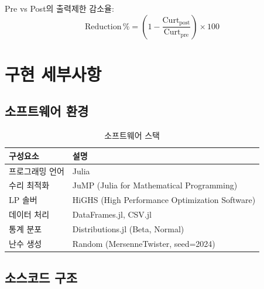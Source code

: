 \documentclass[11pt, a4paper]{article}
\begin{document}
Pre vs Post의 출력제한 감소율:
\begin{equation}
    \text{Reduction}\,\% = \left(1 - \frac{\text{Curt}_{\text{post}}}{\text{Curt}_{\text{pre}}}\right) \times 100
\end{equation}


\section{구현 세부사항}\label{sec:implementation}

\subsection{소프트웨어 환경}

\begin{table}[H]
\centering
\caption{소프트웨어 스택}\label{tab:software}
\begin{tabular}{ll}
\toprule
\textbf{구성요소} & \textbf{설명} \\
\midrule
프로그래밍 언어 & Julia \\
수리 최적화     & JuMP (Julia for Mathematical Programming) \\
LP 솔버        & HiGHS (High Performance Optimization Software) \\
데이터 처리     & DataFrames.jl, CSV.jl \\
통계 분포       & Distributions.jl (Beta, Normal) \\
난수 생성       & Random (MersenneTwister, seed=2024) \\
\bottomrule
\end{tabular}
\end{table}

\subsection{소스코드 구조}
\end{document}
